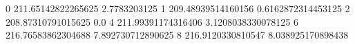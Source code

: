0 211.65142822265625 2.7783203125
1 209.48939514160156 0.6162872314453125
2 208.87310791015625 0.0
4 211.99391174316406 3.1208038330078125
6 216.76583862304688 7.892730712890625
8 216.9120330810547 8.038925170898438
